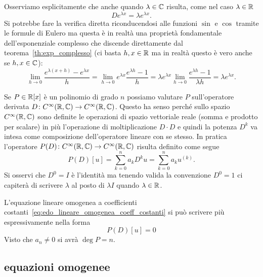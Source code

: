 Osserviamo esplicitamente che anche quando $\lambda \in {\mathbb C}$ risulta,
come nel caso $\lambda\in {\mathbb R}$
\begin{equation}\label{eq:499375}
  D e^{\lambda x} = \lambda e^{\lambda x}.
\end{equation}
Si potrebbe fare la verifica diretta riconducendosi alle funzioni $\sin$ e $\cos$
tramite le formule di Eulero ma questa
è in realtà una proprietà fondamentale dell'esponenziale complesso
che discende direttamente dal teorema~\ref{th:exp_complesso} (ci basta $h,x\in {\mathbb R}$ ma in realtà 
questo è vero anche se $h,x\in {\mathbb C}$):
\[
 \lim_{h\to 0} \frac{e^{\lambda(x+h)}-e^{\lambda x}}{h}
 = \lim_{h\to 0} e^{\lambda x}\frac{e^{\lambda h}-1}{h}
 = \lambda e^{\lambda x} \lim_{h\to 0}\frac{e^{\lambda h}-1}{\lambda h}
 = \lambda e^{\lambda x}.
\]

Se $P\in {\mathbb R}[x]$ è un polinomio di grado $n$
possiamo valutare $P$ sull'operatore
derivata $D\colon C^\infty({\mathbb R},{\mathbb C})\to C^\infty({\mathbb R},{\mathbb C})$.
Questo ha senso perché sullo spazio $C^\infty({\mathbb R},{\mathbb C})$
sono definite le operazioni di spazio vettoriale reale
(somma e prodotto per scalare) in più l'operazione
di moltiplicazione $D\cdot D$ e quindi la potenza
$D^k$ va intesa come composizione dell'operatore
lineare con se stesso.
In pratica l'operatore
$P(D)\colon C^\infty({\mathbb R},{\mathbb C}) \to C^\infty({\mathbb R},{\mathbb C})$
risulta definito come segue
\[
  P(D)[u] = \sum_{k=0}^n a_k D^k u = \sum_{k=0}^n a_k u^{(k)}.
\]
Si osservi che $D^0 = I$ è l'identità ma tenendo valida
la convenzione $D^0 = 1$ ci capiterà di scrivere
$\lambda$ al posto di $\lambda I$ quando $\lambda\in {\mathbb R}$.

L'equazione lineare omogenea a coefficienti costanti~\eqref{eq:edo_lineare_omogenea_coeff_costanti}
si può scrivere più espressivamente nella forma
\[
  P(D)[u] = 0
\]
Visto che $a_n\neq 0$ si avrà $\deg P = n$.

\subsection{equazioni omogenee}

